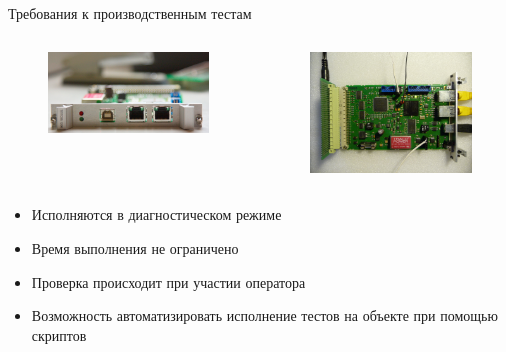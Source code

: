 \documentclass[unicode, notheorems]{beamer}
\begin{document}
\begin{frame}{Требования к производственным тестам}
 \begin{columns}[c]
  \begin{column}{0.6\linewidth}
   \begin{figure}[h]
    \begin{center}
      \includegraphics[width=1.0\columnwidth]{tpts_1206}
    \end{center}
   \end{figure}
  \end{column}
  \begin{column}{0.5\linewidth}
   \begin{figure}[h]
    \includegraphics[width=0.81\columnwidth]{P1030165}
   \end{figure}
  \end{column}
 \end{columns}
 \begin{itemize}
  \item Исполняются в диагностическом режиме
  \item Время выполнения не ограничено
  \item Проверка происходит при участии оператора
  \item Возможность автоматизировать исполнение тестов на объекте при помощью скриптов
 \end{itemize}
\end{frame}
\end{document}
